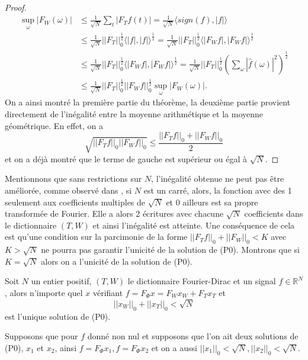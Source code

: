 \begin{exemple}
\begin{proof}
		\begin{align}
			\sup_\omega|F_W(\omega)| &\leq \frac{1}{\sqrt{N}}\sum_t |F_Tf (t)| = \frac{1}{\sqrt{N}}\langle sign(f), |f| \rangle \\
			&\leq  \frac{1}{\sqrt{N}} ||F_T||_0^{\frac{1}{2}} \langle |f|, |f| \rangle ^{\frac{1}{2}} =  \frac{1}{\sqrt{N}} ||F_T||_0^{\frac{1}{2}} \langle |F_W f|, |F_Wf| \rangle ^{\frac{1}{2}} \\
			&\leq   \frac{1}{\sqrt{N}} ||F_T||_0^{\frac{1}{2}} \langle |F_Wf|, |F_Wf| \rangle ^{\frac{1}{2}} =  \frac{1}{\sqrt{N}} ||F_T||_0^{\frac{1}{2}} \left( \sum_\omega|\hat{f}(\omega)|^2 \right)^{\frac{1}{2}}\\ 
			&\leq \frac{1}{\sqrt{N}}||F_T||_0^{\frac{1}{2}} ||F_W f||_0^{\frac{1}{2}} \sup_\omega |F_W(\omega)|.
		\end{align}
		On a ainsi montré la première partie du théorème, la deuxième partie provient directement de l'inégalité entre la moyenne arithmétique et la moyenne géométrique.
		En effet, on a 
		\begin{equation}
			\sqrt{||F_T f||_0 ||F_W f||_0} \leq \frac{||F_T f||_0 + ||F_W f||_0}{2}
		\end{equation}
	et on a déjà montré que le terme de gauche est supérieur ou égal à $\sqrt{N}$.
	\end{proof}
	Mentionnons que sans restrictions sur $N$, l'inégalité obtenue ne peut pas être améliorée, comme observé dans \cite{donohostark} \cite{DonohoHuo}, si $N$ est un carré, alors, la fonction avec des 1 seulement aux coefficients multiples de $\sqrt{N}$ et 0 ailleurs est sa propre transformée de Fourier.
	Elle a alors 2 écritures avec chacune $\sqrt{N}$ coefficients dans le dictionnaire $(T,W)$ et ainsi l'inégalité est atteinte.
	Une conséquence de cela est qu'une condition sur la parcimonie de la forme $||F_T f||_0 + ||F_W||_0 < K$ avec $K>\sqrt{N}$ ne pourra pas garantir l'unicité de la solution de (P0).
	Montrons que si $K = \sqrt{N}$ alors on a l'unicité de la solution de (P0).
	\begin{theoreme}\label{th:Incert2}
		Soit $N$ un entier positif, $(T,W)$ le dictionnaire Fourier-Dirac et un signal $f \in \mathbb{R}^N$, alors n'importe quel $x$ vérifiant $f = F_\Phi x = F_W x_W + F_T x_T$ et 
		\begin{equation}\label{eq:Incert1}
			||x_W||_0 + ||x_T||_0 < \sqrt{N}
		\end{equation}
		est l'unique solution de (P0).
	\end{theoreme}
	Supposons que pour $f$ donné non nul et supposons que l'on ait deux solutions de (P0), $x_1$ et $x_2$, ainsi $f = F_\Phi x_1, f = F_\Phi x_2$ et on a aussi $||x_1||_0 < \sqrt{N}, ||x_2||_0 < \sqrt{N}$.

\end{exemple}
